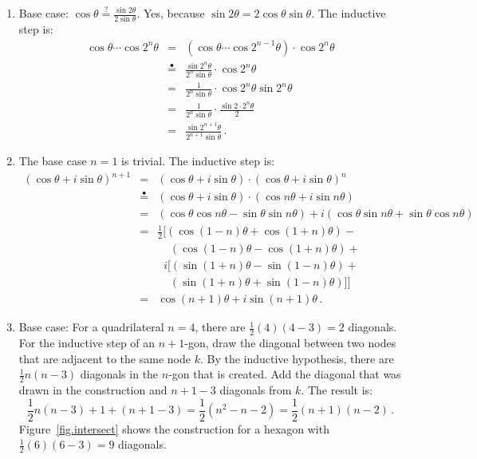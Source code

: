 \documentclass[11pt,a4paper]{report}
\newcommand*{\ih}{\stackrel{\bullet}{=}}
\begin{document}
\begin{enumerate}
\item Base case: $\cos \theta \stackrel{?}{=} \frac{\sin 2\theta}{2\sin \theta}$. Yes, because $\sin 2\theta = 2\cos\theta\sin\theta$. The inductive step is:
\begin{eqnarray*}
\cos\theta\cdots \cos 2^{n}\theta &=& (\cos\theta\cdots \cos 2^{n-1}\theta) \cdot \cos 2^{n}\theta\\
&\ih{}&\frac{\sin 2^{n}\theta}{2^{n}\sin \theta}\cdot \cos 2^{n}\theta\\
&=& \frac{1}{2^{n}\sin \theta} \cdot \cos 2^n\theta\sin 2^{n}\theta\\
&=& \frac{1}{2^{n}\sin \theta} \cdot \frac{\sin 2\cdot 2^{n}\theta}{2}\\
&=&\frac{\sin 2^{n+1}\theta}{2^{n+1}\sin \theta}\,.
\end{eqnarray*}

\item The base case $n=1$ is trivial. The inductive step is:
\begin{eqnarray*}
(\cos \theta + i\sin\theta)^{n+1} &=& (\cos \theta + i\sin \theta)\cdot (\cos \theta + i\sin \theta)^n\\
&\ih& (\cos \theta + i\sin \theta)\cdot (\cos n\theta + i\sin n\theta)\\
&=& (\cos\theta \cos n\theta - \sin \theta \sin n\theta) + i (\cos \theta \sin n\theta + \sin\theta \cos n\theta)\\
&=& \frac{1}{2} [(\cos (1-n)\theta + \cos (1+n)\theta) -\\
&&\;\;\;\;(\cos(1-n)\theta - \cos (1+n)\theta) +\\
&& \;\;i[(\sin (1+n)\theta - \sin (1-n)\theta) +\\
&&\;\;\;\;(\sin(1+n)\theta + \sin (1-n)\theta)]]\\
&=& \cos (n+1)\theta + i\sin (n+1)\theta\,.
\end{eqnarray*}

\item Base case: For a quadrilateral $n=4$, there are $\frac{1}{2}(4)(4-3)=2$ diagonals. For the inductive step of an $n+1$-gon, draw the diagonal between two nodes that are adjacent to the same node $k$. By the inductive hypothesis, there are $\frac{1}{2}n(n-3)$ diagonals in the $n$-gon that is created. Add the diagonal that was drawn in the construction and $n+1-3$ diagonals from $k$. The result is:
\[
\frac{1}{2}n(n-3) + 1 + (n+1-3) =\frac{1}{2}(n^2-n-2)= \frac{1}{2}(n+1)(n-2)\,.
\] 
Figure~\ref{fig.intersect} shows the construction for a hexagon with $\frac{1}{2}(6)(6-3)=9$ diagonals.


\end{enumerate}
\end{document}
